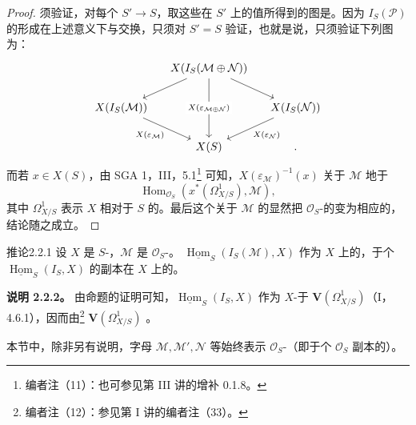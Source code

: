 \begin{proof}
须验证，对每个 $S'\to S$，取这些在 $S'$ 上的值所得到的图是。因为 $I_S(\mathcal P)$ 的形成在上述意义下与交换，只须对 $S'=S$ 验证，也就是说，只须验证下列图为：
\[
\begin{tikzcd}[column sep=small]
&X(I_S(\mathcal M\oplus\mathcal N))\arrow[dl]\arrow[dd,"X(\varepsilon_{\mathcal M\oplus\mathcal N})" description]\arrow[dr]&\\
X(I_S(\mathcal M))\arrow[dr,"X(\varepsilon_{\mathcal M})"']&&X(I_S(\mathcal N))\arrow[dl,"X(\varepsilon_{\mathcal N})"]\\
&X(S)&.
\end{tikzcd}
\]
而若 $x\in X(S)$，由 SGA 1，III，5.1\footnote{编者注（11）：也可参见第 III 讲的增补 0.1.8。} 可知，$X(\varepsilon_{\mathcal M})^{-1}(x)$ 关于 $\mathcal M$ 地于
\[
\operatorname{Hom}_{\mathcal O_S}(x^*(\Omega^1_{X/S}),\mathcal M),
\]
其中 $\Omega^1_{X/S}$ 表示 $X$ 相对于 $S$ 的。最后这个关于 $\mathcal M$ 的显然把 $\mathcal O_S$-的变为相应的，结论随之成立。
\end{proof}
\begin{SGAresult}{推论}{2.2.1}
设 $X$ 是 $S$-，$\mathcal M$ 是 $\mathcal O_S$-。 $\underline{\operatorname{Hom}}_S(I_S(\mathcal M),X)$ 作为 $X$ 上的，于个 $\underline{\operatorname{Hom}}_S(I_S,X)$ 的副本在 $X$ 上的。
\end{SGAresult}
\textbf{说明 2.2.2。} 由命题的证明可知，$\underline{\operatorname{Hom}}_S(I_S,X)$ 作为 $X$-于 $\mathbf V(\Omega^1_{X/S})$（I，4.6.1），因而由\footnote{编者注（12）：参见第 I 讲的编者注（33）。} $\mathbf V(\Omega^1_{X/S})$ 。

本节中，除非另有说明，字母 $\mathcal M,\mathcal M',\mathcal N$ 等始终表示 $\mathcal O_S$-（即于个 $\mathcal O_S$ 副本的）。

